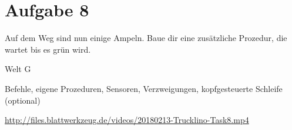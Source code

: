 \pagebreak

\section*{Aufgabe 8}
\label{sec:exercises:8}

Auf dem Weg sind nun einige Ampeln. Baue dir eine zusätzliche Prozedur, die wartet bis es grün wird.

\begin{description}[noitemsep]
  \item[Welt wählen:] Welt G
  \item[Du brauchst:] Befehle, eigene Prozeduren, Sensoren, Verzweigungen, kopfgesteuerte Schleife (optional)
  \item[Video:] \url{http://files.blattwerkzeug.de/videos/20180213-Trucklino-Task8.mp4}
\end{description}

